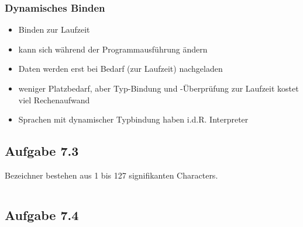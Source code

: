 \documentclass[a4paper, 12pt]{article}
\begin{document}
\subsubsection*{Dynamisches Binden}
\begin{itemize}
  \item Binden zur Laufzeit
  \item kann sich während der Programmausführung ändern
  \item Daten werden erst bei Bedarf (zur Laufzeit) nachgeladen
  \item weniger Platzbedarf, aber Typ-Bindung und -Überprüfung zur Laufzeit
        kostet viel Rechenaufwand
  \item Sprachen mit dynamischer Typbindung haben i.d.R. Interpreter
\end{itemize}

\subsection*{Aufgabe 7.3}

Bezeichner bestehen aus 1 bis 127 signifikanten Characters.

\inputminted{pascal}{aufg3.pas}

\subsection*{Aufgabe 7.4}
\inputminted{pascal}{aufg4.pas}

\end{document}

